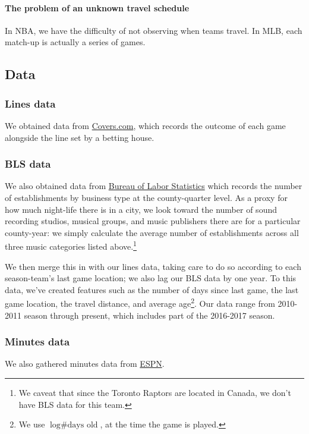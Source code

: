 \documentclass[letterpaper,12pt]{article}
\begin{document}
\paragraph{The problem of an unknown travel schedule} In NBA, we have the difficulty of
not observing when teams travel. 
In MLB, each match-up is actually a series of games.


\subsection{Data}
\subsubsection{Lines data} We obtained data from \href{http://www.covers.com/sports/NBA/matchups?selectedDate=2011-1-01}{Covers.com}, which records the outcome of each game alongside the line set by a betting house.


\subsubsection{BLS data} We also obtained data from
\href{https://www.bls.gov/data/}{Bureau of Labor Statistics} which records the number of establishments by business type at the county-quarter level. As a 
proxy for how much night-life there is in a city, we look toward the 
number of sound recording studios, musical groups, and music publishers there 
are for a particular county-year: we simply calculate the average number of establishments across all three music categories listed above.\footnote{We caveat that since the Toronto Raptors are located in Canada, we don't have BLS data for this team.}

We then merge this in with our lines data, taking care to do so according to each season-team's last game location; we also lag our BLS data by one year.
To this data, we've created features such as 
the number of days since last game, the last game location, the travel distance, and
average age\footnote{We use $\log \textrm{\# days old}$, at the time the game is played.}. Our data range from 2010-2011 season through present, which includes part of the 2016-2017 season.

\subsubsection{Minutes data}
We also gathered minutes data from \href{http://www.espn.com/nba/scoreboard/_/date/}{ESPN}.
\end{document}
